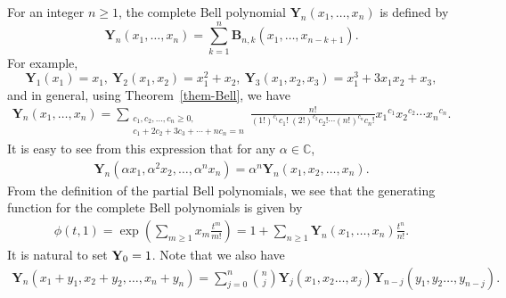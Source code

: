 \documentclass[12pt]{amsart}
\newcommand{\C}{{\mathbb C}}
\newcommand{\thmref}[1]{Theorem~\ref{#1}}
\begin{document}
For an integer $n\geq 1$, the complete Bell polynomial $\mathbf{Y}_n(x_1,\ldots, x_n)$ is defined by 
$$
\mathbf{Y}_n(x_1,\ldots, x_n)=\sum_{k=1}^{n}\mathbf{B}_{n,k}(x_1,\ldots, x_{n-k+1}).
$$ 
For example,
$$
\mathbf{Y}_1(x_1)=x_1, \ \mathbf{Y}_2(x_1,x_2)=x_1^2+x_2, \ \mathbf{Y}_3(x_1,x_2,x_3)=x_1^3+3x_1x_2+x_3,
$$
and in general, using \thmref{them-Bell}, we have
\begin{align}\label{eq-c-bell}
\mathbf{Y}_n(x_1,\ldots,x_n)=\sum_{ \substack{c_1,c_2, \ldots,c_n \geq 0, \\c_1+2c_2+3c_3+\cdots+nc_n=n}}\frac{n!}{(1!)^{c_1}c_1! \ (2!)^{c_2}c_2!\cdots (n!)^{c_n}c_n!}{x_1}^{c_1}{x_2}^{c_2}\cdots {x_n}^{c_n}.
\end{align}
It is easy to see from this expression that for any  $\alpha\in \C$, 
\begin{align}\label{hom-prop}
\mathbf{Y}_{n}(\alpha x_1,\alpha^2x_2,\ldots,\alpha^nx_n)=\alpha^n\mathbf{Y}_{n}(x_1,x_2,\ldots,x_n).
\end{align}
From the definition of the partial Bell polynomials, we see that the generating function for the complete Bell polynomials is given by
\begin{align}\label{gen-complete-Bell}
\phi(t,1)=\exp\left(\sum_{m\geq 1}x_m\frac{t^m}{m!}\right)
=1+\sum_{n\geq 1}\mathbf{Y}_n(x_1,\ldots,x_n)\frac{t^n}{n!}.
\end{align}
It is natural to set ${\bf Y}_{0}=1$. Note that we also have 
\begin{align}\label{eq-sum-variable}
\mathbf{Y}_n(x_1+y_1,x_2+y_2,\ldots, x_n+y_n)=\sum_{j=0}^{n}\binom{n}{j}\mathbf{Y}_j(x_1,x_2\ldots, x_{j})\mathbf{Y}_{n-j}(y_1,y_2\ldots, y_{n-j}).
\end{align}
\end{document}
